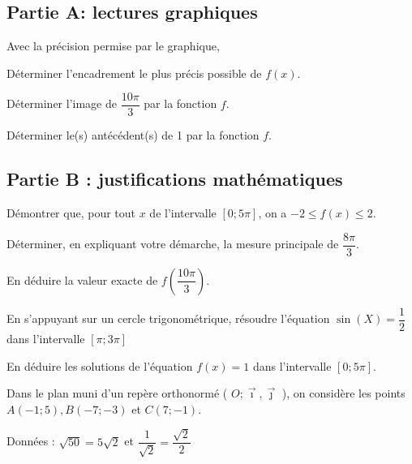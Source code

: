 \documentclass[12pt,a4paper]{article}  %
\begin{document}
\subsection*{Partie A: lectures graphiques}
Avec la précision permise par le graphique,

\begin{enumMet}
	\item Déterminer l'encadrement le plus précis possible de $f(x)$.
	\item Déterminer l'image de $\dfrac{10 \pi}{3}$ par la fonction $f$.
	\item Déterminer le(s) antécédent(s) de 1 par la fonction $f$.
\end{enumMet}

\subsection*{Partie B : justifications mathématiques}
\begin{enumMet}
	\item Démontrer que, pour tout $x$ de l'intervalle $[0 ; 5 \pi]$, on a $-2 \leqslant f(x) \leqslant 2$.
	\item \begin{enumMet}
		\item Déterminer, en expliquant votre démarche, la mesure principale de $\dfrac{8 \pi}{3}$.\\
		\item En déduire la valeur exacte de $f\left(\dfrac{10 \pi}{3}\right)$.
	\end{enumMet}
	\item \begin{enumMet}
		\item En s'appuyant sur un cercle trigonométrique, résoudre l'équation $\sin (X)=\dfrac{1}{2}$ dans l'intervalle $\left[\pi ; 3 \pi\right]$
		\item En déduire les solutions de l'équation $f(x)=1$ dans l'intervalle $[0 ; 5 \pi]$.
	\end{enumMet}
\end{enumMet}

\newpage
{}
Dans le plan muni d'un repère orthonormé ( $O ; \vec{\imath}, \vec{\jmath}$ ), on considère les points $A(-1 ; 5), B(-7 ; -3)$ et $C(7 ;-1)$.

Données : $\sqrt{50}=5 \sqrt{2}$ et $\dfrac{1}{\sqrt{2}}=\dfrac{\sqrt{2}}{2}$
\end{document}
